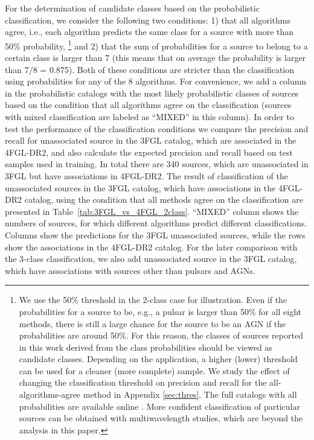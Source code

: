 \documentclass{aa}
\begin{document}
For the determination of candidate classes based on the probabilistic classification, we consider the following two conditions:
1) that all algorithms agree, i.e., each algorithm predicts the same class for a source with more than 50\% probability,%
\footnote{We use the 50\% threshold in the 2-class case for illustration. Even if the probabilities for a source to be, e.g., a pulsar is larger than 50\% for all eight methods, there is still a large chance for the source to be an AGN if the probabilities are around 50\%. 
For this reason, the classes of sources reported in this work derived from the class probabilities should be viewed as candidate classes.
Depending on the application, a higher (lower) threshold can be used for a cleaner (more complete) sample. 
We study the effect of changing the classification threshold on precision and recall for the all-algorithms-agree method in 
Appendix \ref{sec:thres}.
The full catalogs with all probabilities are available online \citep{SOM_material}.
More confident classification of particular sources can be obtained with multiwavelength studies, 
which are beyond the analysis in this paper.}
 and 
2) that the sum of probabilities for a source to belong to a certain class is larger than 7 
(this means that on average the probability is larger than 7/8 = 0.875).
Both of these conditions are stricter than the classification using probabilities for any of the 8 algorithms.
For convenience, we add a column in the probabilistic catalogs with the most likely probabilistic classes of sources based on the condition that all algorithms agree on the classification (sources with mixed classification are labeled as ``MIXED'' in this column).
In order to test the performance of the classification conditions we compare the precision and recall for unassociated source in the 3FGL catalog, which are associated in the 4FGL-DR2, and also calculate the expected precision and recall based on
test samples used in training.
In total there are 340 sources, which are unassociated in 3FGL but have associations in 4FGL-DR2.
The result of classification of the unassociated sources in the 3FGL catalog, which have associations in the 4FGL-DR2 catalog, 
using the condition that all methods agree on the classification are presented in Table~\ref{tab:3FGL_vs_4FGL_2class}.
``MIXED'' column shows the numbers of sources, for which different algorithms predict different classifications.
Columns show the predictions for the 3FGL unassociated sources, while the rows show the associations in the 4FGL-DR2 catalog.
For the later comparison with the 3-class classification, we also add unassociated source in the 3FGL catalog, 
which have associations with sources other than pulsars and AGNs.
\end{document}
